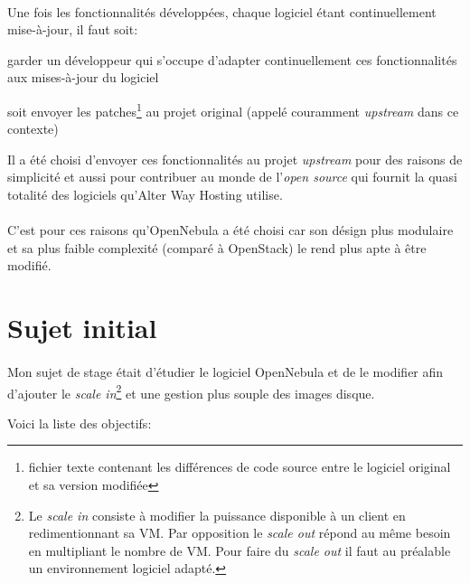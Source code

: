 \paragraph*{}
Une fois les fonctionnalités développées, chaque logiciel étant continuellement mise-à-jour, il faut soit:
\begin{listi}
	\item garder un développeur qui s'occupe d'adapter continuellement ces fonctionnalités aux mises-à-jour du logiciel
	\item soit envoyer les patches\footnote{fichier texte contenant les différences de code source entre le logiciel original et sa version modifiée}
		au projet original (appelé couramment \emph{upstream} dans ce contexte)
\end{listi}

Il a été choisi d'envoyer ces fonctionnalités au projet \emph{upstream} pour des raisons de simplicité et aussi pour contribuer au monde de
l'\emph{open source} qui fournit la quasi totalité des logiciels qu'Alter Way Hosting utilise.

\paragraph*{}
C'est pour ces raisons qu'OpenNebula a été choisi car son désign plus modulaire et sa plus faible complexité (comparé à OpenStack) le rend
plus apte à être modifié.

\section{Sujet initial}
\paragraph*{}
Mon sujet de stage était d'étudier le logiciel OpenNebula et de le modifier afin d'ajouter le \emph{scale in}\footnote{Le \emph{scale in} consiste à
modifier la puissance disponible à un client en redimentionnant sa VM. Par opposition le \emph{scale out} répond au même besoin en multipliant le nombre de VM.
Pour faire du \emph{scale out} il faut au préalable un environnement logiciel adapté.} et une gestion plus souple des images disque.

Voici la liste des objectifs:

